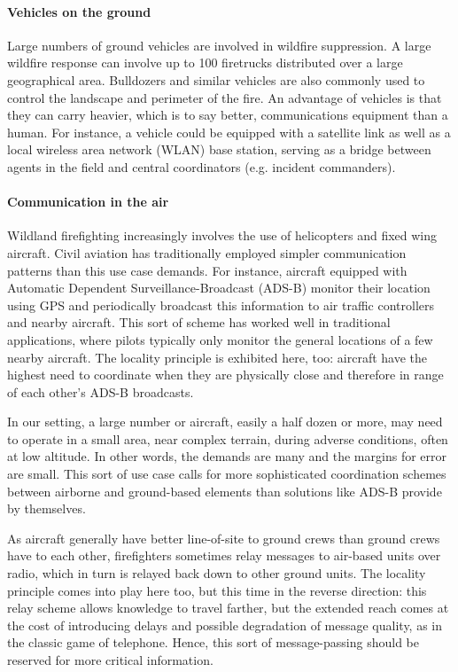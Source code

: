 \documentclass[]             %
{NASA}                       %
\theoremstyle{definition}
\begin{document}
\paragraph{Vehicles on the ground}
Large numbers of ground vehicles are involved in wildfire
suppression. A large wildfire response can involve up to 100
firetrucks distributed over a large geographical area. Bulldozers and
similar vehicles are also commonly used to control the landscape and
perimeter of the fire. An advantage of vehicles is that they can carry
heavier, which is to say better, communications equipment than a
human. For instance, a vehicle could be equipped with a satellite link
as well as a local wireless area network (WLAN) base station, serving
as a bridge between agents in the field and central coordinators
(e.g. incident commanders).

\paragraph{Communication in the air}

Wildland firefighting increasingly involves the use of helicopters and
fixed wing aircraft. Civil aviation has traditionally employed simpler
communication patterns than this use case demands. For instance,
aircraft equipped with Automatic Dependent Surveillance-Broadcast
(ADS-B) monitor their location using GPS and periodically broadcast
this information to air traffic controllers and nearby aircraft. This
sort of scheme has worked well in traditional applications, where
pilots typically only monitor the general locations of a few nearby
aircraft. The locality principle is exhibited here, too: aircraft have
the highest need to coordinate when they are physically close and
therefore in range of each other's ADS-B broadcasts.

In our setting, a large number or aircraft, easily a half dozen or
more, may need to operate in a small area, near complex terrain,
during adverse conditions, often at low altitude. In other words, the
demands are many and the margins for error are small. This sort of use
case calls for more sophisticated coordination schemes between
airborne and ground-based elements than solutions like ADS-B provide
by themselves.

As aircraft generally have better line-of-site to ground crews than
ground crews have to each other, firefighters sometimes relay messages
to air-based units over radio, which in turn is relayed back down to
other ground units. The locality principle comes into play here too,
but this time in the reverse direction: this relay scheme allows
knowledge to travel farther, but the extended reach comes at the cost
of introducing delays and possible degradation of message quality, as
in the classic game of telephone. Hence, this sort of message-passing
should be reserved for more critical information.
\end{document}
